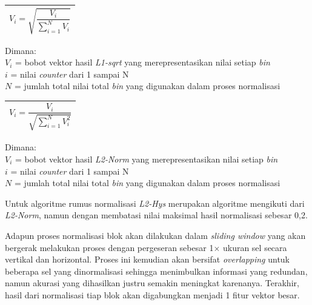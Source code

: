 \begin{table}[H]
	\small
	\begin{adjustbox}{width=1\textwidth}
		\begin{tabular}{|p{13.55cm}|}
			\hline
			\begin{equation} 
			V_{i} = \sqrt{\frac{V_{i}}{\sum_{i=1}^{N}V_{i}}}
			\end{equation}\\
			\hline
		\end{tabular}
	\end{adjustbox}
\end{table}
\noindent Dimana:\\
$V_{i}$ = bobot vektor hasil \textit{L1-sqrt} yang merepresentasikan nilai setiap \textit{bin}\\
$i$ = nilai \textit{counter} dari 1 sampai N\\
$N$ = jumlah total nilai total \textit{bin} yang digunakan dalam proses normalisasi

\begin{table}[H]
	\small
	\begin{adjustbox}{width=1\textwidth}
		\begin{tabular}{|p{13.55cm}|}
			\hline
			\begin{equation} 
			V_{i} = \frac{V_{i}}{\sqrt{\sum_{i=1}^{N}V_{i}^2}}
			\label{eq:L2-Norm}
			\end{equation}\\
			\hline
		\end{tabular}
	\end{adjustbox}
\end{table}
\noindent Dimana:\\
$V_{i}$ = bobot vektor hasil \textit{L2-Norm} yang merepresentasikan nilai setiap \textit{bin}\\
$i$ = nilai \textit{counter} dari 1 sampai N\\
$N$ = jumlah total nilai total \textit{bin} yang digunakan dalam proses normalisasi

\noindent Untuk algoritme rumus normalisasi \textit{L2-Hys} merupakan algoritme mengikuti dari \textit{L2-Norm}, namun dengan membatasi nilai maksimal hasil normalisasi sebesar 0,2.

\noindent Adapun proses normalisasi blok akan dilakukan dalam \textit{sliding window} yang akan bergerak melakukan proses dengan pergeseran sebesar 1$\times$ ukuran sel secara vertikal dan horizontal. Proses ini kemudian akan bersifat \textit{overlapping} untuk beberapa sel yang dinormalisasi sehingga menimbulkan informasi yang redundan, namun akurasi yang dihasilkan justru semakin meningkat karenanya. Terakhir, hasil dari normalisasi tiap blok akan digabungkan menjadi 1 fitur vektor besar.\\

